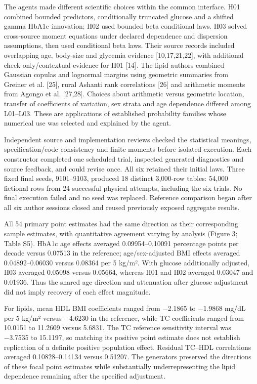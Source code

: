 \documentclass[10pt,twocolumn]{article}
\begin{document}
The agents made different scientific choices within the common interface. H01 combined bounded predictors, conditionally truncated glucose and a shifted gamma HbA1c innovation; H02 used bounded beta conditional laws. H03 solved cross-source moment equations under declared dependence and dispersion assumptions, then used conditional beta laws. Their source records included overlapping age, body-size and glycemia evidence [10,17,21,22], with additional check-only/contextual evidence for H01 [14]. The lipid authors combined Gaussian copulas and lognormal margins using geometric summaries from Greiner et al. [25], rural Ashanti rank correlations [26] and arithmetic moments from Agongo et al. [27,28]. Choices about arithmetic versus geometric location, transfer of coefficients of variation, sex strata and age dependence differed among L01–L03. These are applications of established probability families whose numerical use was selected and explained by the agent.


Independent source and implementation reviews checked the statistical meanings, specification/code consistency and finite moments before isolated execution. Each constructor completed one scheduled trial, inspected generated diagnostics and source feedback, and could revise once. All six retained their initial laws. Three fixed final seeds, 9101–9103, produced 18 distinct 3,000-row tables: 54,000 fictional rows from 24 successful physical attempts, including the six trials. No final execution failed and no seed was replaced. Reference comparison began after all six author sessions closed and reused previously exposed aggregate results.


All 54 primary point estimates had the same direction as their corresponding sample estimates, with quantitative agreement varying by analysis (Figure 3; Table S5). HbA1c age effects averaged 0.09954–0.10091 percentage points per decade versus 0.07513 in the reference; age/sex-adjusted BMI effects averaged 0.04892–0.06030 versus 0.08364 per 5 kg/m². With glucose additionally adjusted, H03 averaged 0.05098 versus 0.05664, whereas H01 and H02 averaged 0.03047 and 0.01936. Thus the shared age direction and attenuation after glucose adjustment did not imply recovery of each effect magnitude.


For lipids, mean HDL BMI coefficients ranged from −2.1865 to −1.9868 mg/dL per 5 kg/m² versus −4.6230 in the reference, while TC coefficients ranged from 10.0151 to 11.2609 versus 5.6831. The TC reference sensitivity interval was −3.7535 to 15.1197, so matching its positive point estimate does not establish replication of a definite positive population effect. Residual TC–HDL correlations averaged 0.10828–0.14134 versus 0.51207. The generators preserved the directions of these focal point estimates while substantially underrepresenting the lipid dependence remaining after the specified adjustment.
\end{document}
